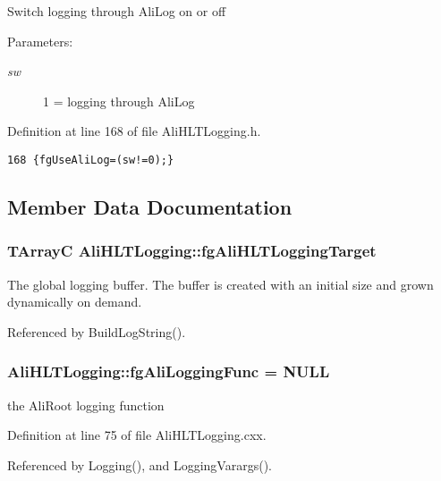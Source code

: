 Switch logging through Ali\-Log on or off \begin{Desc}
\item[Parameters:]
\begin{description}
\item[{\em sw}]1 = logging through Ali\-Log \end{description}
\end{Desc}


Definition at line 168 of file Ali\-HLTLogging.h.

\footnotesize\begin{verbatim}168 {fgUseAliLog=(sw!=0);}
\end{verbatim}\normalsize 




\subsection{Member Data Documentation}
\subsubsection{\setlength{\rightskip}{0pt plus 5cm}TArray\-C {\bf Ali\-HLTLogging::fg\-Ali\-HLTLogging\-Target}\hspace{0.3cm}{\tt  [static, private]}}\label{classAliHLTLogging_v3}


The global logging buffer. The buffer is created with an initial size and grown dynamically on demand. 

Referenced by Build\-Log\-String().
\subsubsection{ {\bf Ali\-HLTLogging::fg\-Ali\-Logging\-Func} = NULL\hspace{0.3cm}{\tt  [static, protected]}}\label{classAliHLTLogging_t0}


the Ali\-Root logging function 

Definition at line 75 of file Ali\-HLTLogging.cxx.

Referenced by Logging(), and Logging\-Varargs().
